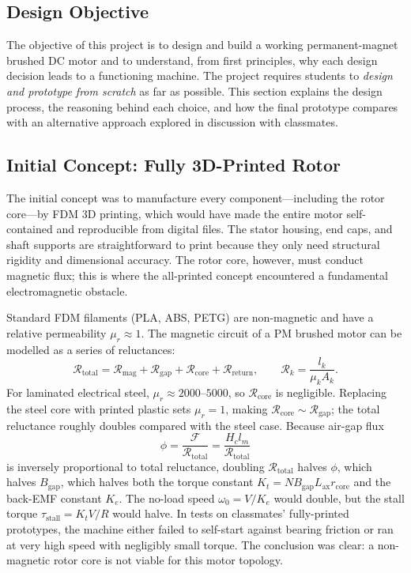 \documentclass[10pt, twocolumn, a4paper]{article}
\begin{document}
\subsection{Design Objective}

The objective of this project is to design and build a working
permanent-magnet brushed DC motor and to understand, from first principles,
why each design decision leads to a functioning machine.  The project
requires students to \emph{design and prototype from scratch} as far as
possible.  This section explains the design process, the reasoning behind
each choice, and how the final prototype compares with an alternative
approach explored in discussion with classmates.

\subsection{Initial Concept: Fully 3D-Printed Rotor}

The initial concept was to manufacture every component---including the
rotor core---by FDM 3D printing, which would have made the entire motor
self-contained and reproducible from digital files.  The stator housing,
end caps, and shaft supports are straightforward to print because they only
need structural rigidity and dimensional accuracy.  The rotor core,
however, must conduct magnetic flux; this is where the all-printed concept
encountered a fundamental electromagnetic obstacle.

Standard FDM filaments (PLA, ABS, PETG) are non-magnetic and have a
relative permeability $\mu_r \approx 1$.  The magnetic circuit of a PM
brushed motor can be modelled as a series of reluctances:
\begin{equation}
  \mathcal{R}_\text{total} =
    \mathcal{R}_\text{mag} + \mathcal{R}_\text{gap} +
    \mathcal{R}_\text{core} + \mathcal{R}_\text{return},
  \qquad
  \mathcal{R}_k = \frac{l_k}{\mu_k A_k}.
\end{equation}
For laminated electrical steel, $\mu_r \approx 2000$--$5000$, so
$\mathcal{R}_\text{core}$ is negligible.  Replacing the steel core with
printed plastic sets $\mu_r = 1$, making
$\mathcal{R}_\text{core} \sim \mathcal{R}_\text{gap}$; the total reluctance
roughly doubles compared with the steel case.  Because air-gap flux
\begin{equation}
  \phi = \frac{\mathcal{F}}{\mathcal{R}_\text{total}} = \frac{H_c l_m}{\mathcal{R}_\text{total}}
\end{equation}
is inversely proportional to total reluctance, doubling $\mathcal{R}_\text{total}$
halves $\phi$, which halves $B_\text{gap}$, which halves both the torque
constant $K_t = N B_\text{gap} L_\text{ax} r_\text{core}$ and the back-EMF
constant $K_e$.  The no-load speed $\omega_0 = V/K_e$ would double, but the
stall torque $\tau_\text{stall} = K_t V/R$ would halve.  In tests on
classmates' fully-printed prototypes, the machine either failed to
self-start against bearing friction or ran at very high speed with
negligibly small torque.  The conclusion was clear: a non-magnetic rotor
core is not viable for this motor topology.
\end{document}
